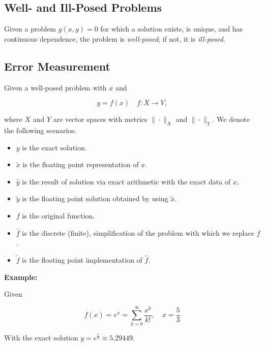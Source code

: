 \subsection{Well- and Ill-Posed Problems}

Given a problem \(g(x, y) = 0\) for which a solution exists, is unique, and has continuous dependence, the problem is 
\emph{well-posed}; if not, it is \emph{ill-posed}.

\subsection{Error Measurement}

Given a well-posed problem with \(x\) and  

\[
    y = f(x) \quad f: X \to V,
\]

where \(X\) and \(Y\) are vector spaces with metrics \(\|\cdot\|_X\) and \(\|\cdot\|_Y\). We denote 
the following scenarios: 

\begin{itemize}
   
    \item \(y\) is the exact solution. 
  
    \item \(\tilde{x}\) is the floating point representation of \(x\). 
 
    \item \(\hat{y}\) is the result of solution via exact arithmetic with the exact data of \(x\). 

    \item \(\tilde{y}\) is the floating point solution obtained by using \(\tilde{x}\).

    \item \(f\) is the original function. 

    \item \(\hat{f}\) is the discrete (finite), simplification of the problem with which we replace \(f\). 

    \item \(\tilde{f}\) is the floating point implementation of \(\hat{f}\).
    
\end{itemize}

\textbf{Example:}

Given 

\[
    f(x) = e^x = \sum_{k = 0}^{\infty} \frac{x^k}{k!}, \quad x = \frac{5}{3}
\]

With the exact solution \(y = e^\frac{5}{3} \approx 5.29449\). 

